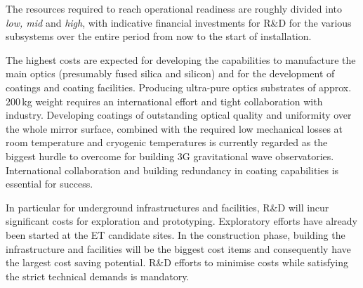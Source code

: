 The resources required to reach operational readiness are roughly divided into \textit{low, mid} and \textit{high}, with indicative financial investments for R\&D for the various subsystems over the entire period from now to the start of installation. 

The highest costs are expected for developing the capabilities to manufacture the main optics (presumably fused silica and silicon) and for the development of coatings and coating facilities. 
Producing ultra-pure optics substrates of approx. 200\,kg weight requires an international effort and tight collaboration with industry. Developing coatings of outstanding optical quality and uniformity over the whole mirror surface, combined with the required low mechanical losses at  room temperature and cryogenic temperatures is currently regarded as the biggest hurdle to overcome for building 3G gravitational wave observatories. International collaboration and building redundancy in coating capabilities is essential for success.

In particular for underground infrastructures and facilities, R\&D will incur significant costs for exploration and prototyping. Exploratory efforts have already been started at the ET candidate sites. In the construction phase, building the infrastructure and facilities will be the biggest cost items and consequently have the largest cost saving potential. R\&D efforts to minimise costs while satisfying the strict technical demands is mandatory.



